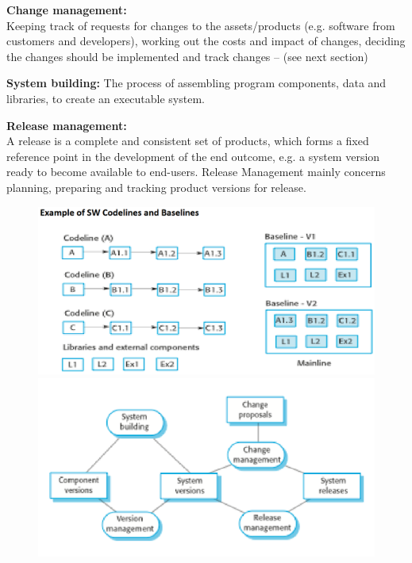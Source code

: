 \documentclass[]{project_plan}
\begin{document}
\newpage

\textbf{Change management:}\\Keeping track of requests for changes to the assets/products (e.g. software from
customers and developers), working out the costs and impact of changes, deciding the changes should be
implemented and track changes – (see next section)

\textbf{System building:} The process of assembling program components, data and libraries, to create an
executable system.

\textbf{Release management:}\\A release is a complete and consistent set of products, which forms a fixed
reference point in the development of the end outcome, e.g. a system version ready to become available to
end-users. Release Management mainly concerns planning, preparing and tracking product versions for
release.

\begin{figure}[h!]
  \centering
  \includegraphics[width=\linewidth]{codelines_and_baselines.png}
  \includegraphics[width=\linewidth]{configuration_management.png}
\end{figure}

\newpage
\end{document}
